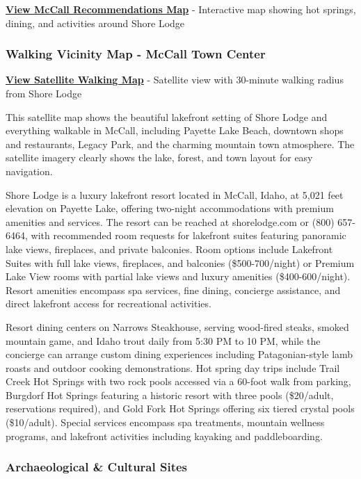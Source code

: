 \documentclass[
  11pt,
  letterpaper,
  DIV=10,
  numbers=noendperiod]{scrartcl}
\begin{document}
\textbf{\href{images/mccall_idaho_recommendations_map.html}{View McCall
Recommendations Map}} - Interactive map showing hot springs, dining, and
activities around Shore Lodge

\subsubsection{Walking Vicinity Map - McCall Town
Center}\label{walking-vicinity-map---mccall-town-center}

\textbf{\href{images/mccall_id_walking_map.html}{View Satellite Walking
Map}} - Satellite view with 30-minute walking radius from Shore Lodge

This satellite map shows the beautiful lakefront setting of Shore Lodge
and everything walkable in McCall, including Payette Lake Beach,
downtown shops and restaurants, Legacy Park, and the charming mountain
town atmosphere. The satellite imagery clearly shows the lake, forest,
and town layout for easy navigation.

Shore Lodge is a luxury lakefront resort located in McCall, Idaho, at
5,021 feet elevation on Payette Lake, offering two-night accommodations
with premium amenities and services. The resort can be reached at
shorelodge.com or (800) 657-6464, with recommended room requests for
lakefront suites featuring panoramic lake views, fireplaces, and private
balconies. Room options include Lakefront Suites with full lake views,
fireplaces, and balconies (\$500-700/night) or Premium Lake View rooms
with partial lake views and luxury amenities (\$400-600/night). Resort
amenities encompass spa services, fine dining, concierge assistance, and
direct lakefront access for recreational activities.

Resort dining centers on Narrows Steakhouse, serving wood-fired steaks,
smoked mountain game, and Idaho trout daily from 5:30 PM to 10 PM, while
the concierge can arrange custom dining experiences including
Patagonian-style lamb roasts and outdoor cooking demonstrations. Hot
spring day trips include Trail Creek Hot Springs with two rock pools
accessed via a 60-foot walk from parking, Burgdorf Hot Springs featuring
a historic resort with three pools (\$20/adult, reservations required),
and Gold Fork Hot Springs offering six tiered crystal pools
(\$10/adult). Special services encompass spa treatments, mountain
wellness programs, and lakefront activities including kayaking and
paddleboarding.

\subsubsection{Archaeological \& Cultural
Sites}\label{archaeological-cultural-sites-1}
\end{document}
